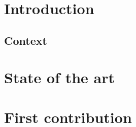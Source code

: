 \documentclass[8pt]{beamer}
\begin{document}
\firstpage

\section{Introduction}
		\subsection{Context}
		

\tableofcontent

%		
%		

\section{State of the art}
		

\section{First contribution}
		
		
		
		
		
		
\end{document}
